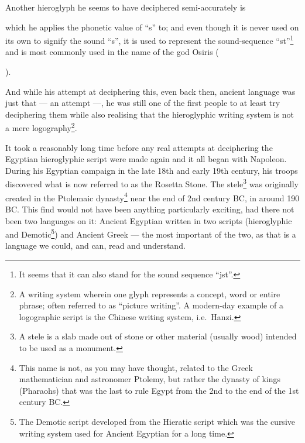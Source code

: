 \documentclass[a5paper,twoside,11pt]{report}
\begin{document}
	Another hieroglyph he seems to have deciphered semi-accurately is \begin{hieroglyph}{\leavevmode {}}\end{hieroglyph} which he applies the phonetic value of “s” to; and even though it is never used on its own to signify the sound “s”, it is used to represent the sound-sequence “st”\footnote{It seems that it can also stand for the sound sequence “jst”.} and is most commonly used in the name of the god Osiris (\begin{hieroglyph}{\leavevmode {}\HinterSignsSpace
{}}\end{hieroglyph}).

	And while his attempt at deciphering this, even back then, ancient language was just that — an attempt —, he was still one of the first people to at least try deciphering them while also realising that the hieroglyphic writing system is not a mere logography\footnote{A writing system wherein one glyph represents a concept, word or entire phrase; often referred to as “picture writing”. A modern-day example of a logographic script is the Chinese writing system, i.e.\ Hanzi.}. 

	It took a reasonably long time before any real attempts at deciphering the Egyptian hieroglyphic script were made again and it all began with Napoleon. During his Egyptian campaign in the late 18th and early 19th century, his troops discovered what is now referred to as the Rosetta Stone. The stele\footnote{A stele is a slab made out of stone or other material (usually wood) intended to be used as a monument.} was originally created in the Ptolemaic dynasty\footnote{This name is not, as you may have thought, related to the Greek mathematician and astronomer Ptolemy, but rather the dynasty of kings (Pharaohs) that was the last to rule Egypt from the 2nd to the end of the 1st century BC.} near the end of 2nd century BC, in around 190 BC. This find would not have been anything particularly exciting, had there not been two languages on it: Ancient Egyptian written in two scripts (hieroglyphic and Demotic\footnote{The Demotic script developed from the Hieratic script which was the cursive writing system used for Ancient Egyptian for a long time.}) and Ancient Greek — the most important of the two, as that is a language we could, and can,  read and understand.
	
\end{document}
